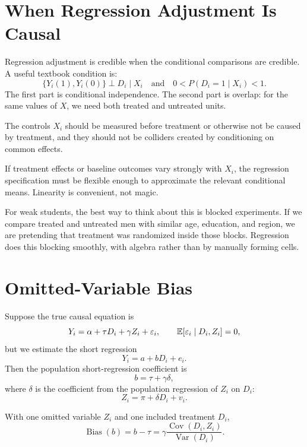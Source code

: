 \section{When Regression Adjustment Is Causal}

Regression adjustment is credible when the conditional comparisons are
credible. A useful textbook condition is:
\[
  \{Y_i(1),Y_i(0)\}\perp D_i\mid X_i
  \quad \text{and} \quad
  0<P(D_i=1\mid X_i)<1.
\]
The first part is conditional independence. The second part is overlap:
for the same values of $X$, we need both treated and untreated units.

\begin{assN}
The controls $X_i$ should be measured before treatment or otherwise not be
caused by treatment, and they should not be colliders created by conditioning
on common effects.
\end{assN}

\begin{assN}
If treatment effects or baseline outcomes vary strongly with $X_i$, the
regression specification must be flexible enough to approximate the relevant
conditional means. Linearity is convenient, not magic.
\end{assN}

For weak students, the best way to think about this is blocked experiments.
If we compare treated and untreated men with similar age, education, and region,
we are pretending that treatment was randomized inside those blocks. Regression
does this blocking smoothly, with algebra rather than by manually forming
cells.

\section{Omitted-Variable Bias}

Suppose the true causal equation is
\[
  Y_i=\alpha+\tau D_i+\gamma Z_i+\varepsilon_i,
  \qquad
  \mathbb{E}[\varepsilon_i\mid D_i,Z_i]=0,
\]
but we estimate the short regression
\[
  Y_i=a+bD_i+e_i.
\]
Then the population short-regression coefficient is
\[
  b=\tau+\gamma\delta,
\]
where $\delta$ is the coefficient from the population regression of $Z_i$ on
$D_i$:
\[
  Z_i=\pi+\delta D_i+v_i.
\]

\begin{thmN}
With one omitted variable $Z_i$ and one included treatment $D_i$,
\[
  \operatorname{Bias}(b)=b-\tau
  =
  \gamma
  \frac{\operatorname{Cov}(D_i,Z_i)}{\operatorname{Var}(D_i)}.
\]
\end{thmN}

